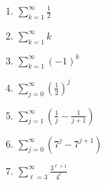 \documentclass[12pt]{article}
\newif\ifans
\begin{document}
\begin{enumerate}

\item $\sum_{k=1}^{\infty}\frac{1}{2}$

\ifans{\fbox{$s_1=\frac{1}{2}, s_2=\frac{1}{2}+\frac{1}{2}=1, 
s_3=\frac{1}{2}+\frac{1}{2}+\frac{1}{2}=\frac{3}{2}, s_4=\frac{1}{2}+\frac{1}{2}+\frac{1}{2}+\frac{1}{2}=2$    }} \fi

\item $\sum_{k=1}^{\infty}k$

\ifans{\fbox{$s_1=1, s_2=1+2=3, s_3=1+2+3=6, s_4=1+2+3+4=10$    }} \fi

\item $\sum_{k=1}^{\infty}(-1)^{k}$

\ifans{\fbox{$s_1=-1, s_2=-1+1=0, s_3=-1+1-1=-1, s_4=-1+1-1+1=0$    }} \fi

\item $\sum_{j=0}^{\infty} \left(\frac{1}{2}\right)^{j}$

\ifans{\fbox{$s_0=1, s_1=1+\frac{1}{2}=\frac{3}{2}, s_2=1+\frac{1}{2}+\frac{1}{4}=\frac{7}{4}, s_3=1+\frac{1}{2}+\frac{1}{4}+\frac{1}{8}=\frac{15}{8}$    }} \fi

\item $\sum_{j=1}^{\infty} \left(\frac{1}{j}-\frac{1}{j+1}\right)$

\ifans{\fbox{\parbox{1\linewidth}{$s_1=1-\frac{1}{2}=\frac{1}{2}
\\s_2=\left(1-\frac{1}{2}\right)+\left(\frac{1}{2}-\frac{1}{3}\right)=1-\frac{1}{3}=\frac{2}{3}
\\s_3=\left(1-\frac{1}{2}\right)+\left(\frac{1}{2}-\frac{1}{3}\right)+\left(\frac{1}{3}-\frac{1}{4}\right)=1-\frac{1}{4}=\frac{3}{4}
\\s_4=\left(1-\frac{1}{2}\right)+\left(\frac{1}{2}-\frac{1}{3}\right)+\left(\frac{1}{3}-\frac{1}{4}\right)+\left(\frac{1}{4}-\frac{1}{5}\right)=1-\frac{1}{5}=\frac{4}{5}$    }}} \fi

\item $\sum_{j=0}^{\infty}(7^{j}-7^{j+1})$

\ifans{\fbox{\parbox{1\linewidth}{$s_0=1-7
\\s_1=(1-7)+(7-7^2)=1-7^2
\\s_2=(1-7)+(7-7^2)+(7^2-7^3)=1-7^3
\\s_3=(1-7)+(7-7^2)+(7^2-7^3)+(7^3-7^4)=1-7^4$    }}} \fi

\item $\sum_{\ell=3}^{\infty}\frac{3^{\ell+1}}{4^{\ell}}$


\end{enumerate}
\end{document}

